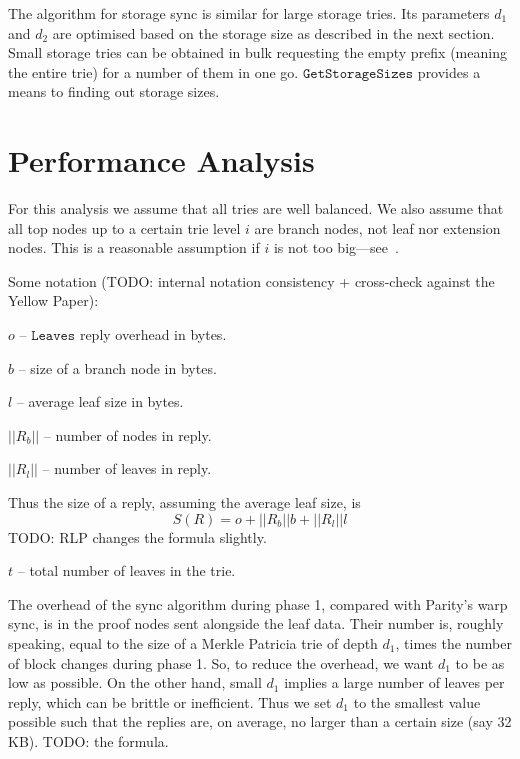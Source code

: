 \documentclass{amsart}
\begin{document}
The algorithm for storage sync is similar for large storage tries.
Its parameters $d_1$ and $d_2$ are optimised based on the storage size as described in the next section.
Small storage tries can be obtained in bulk requesting the empty prefix (meaning the entire trie) for a number of them in one go.
$\texttt{GetStorageSizes}$ provides a means to finding out storage sizes.

\section{Performance Analysis}

For this analysis we assume that all tries are well balanced.
We also assume that all top nodes up to a certain trie level $i$ are branch nodes, not leaf nor extension nodes.
This is a reasonable assumption if $i$ is not too big---see~\cite{akhunov_1x_workshop_part2}.

Some notation (TODO: internal notation consistency + cross-check against the Yellow Paper):

$o$ -- $\texttt{Leaves}$ reply overhead in bytes.

$b$ -- size of a branch node in bytes.

$l$ -- average leaf size in bytes.

$||R_b||$ -- number of nodes in reply.

$||R_l||$ -- number of leaves in reply.

Thus the size of a reply, assuming the average leaf size, is
\begin{equation}
    S(R) = o + ||R_b|| b + ||R_l|| l
\end{equation}
TODO: RLP changes the formula slightly.

$t$ -- total number of leaves in the trie.

The overhead of the sync algorithm during phase 1, compared with Parity's warp sync, is in the proof nodes sent alongside the leaf data.
Their number is, roughly speaking, equal to the size of a Merkle Patricia trie of depth $d_1$, times the number of block changes during phase 1.
So, to reduce the overhead, we want $d_1$ to be as low as possible.
On the other hand, small $d_1$ implies a large number of leaves per reply, which can be brittle or inefficient.
Thus we set $d_1$ to the smallest value possible such that the replies are, on average, no larger than a certain size (say 32 KB).
TODO: the formula.
\end{document}
